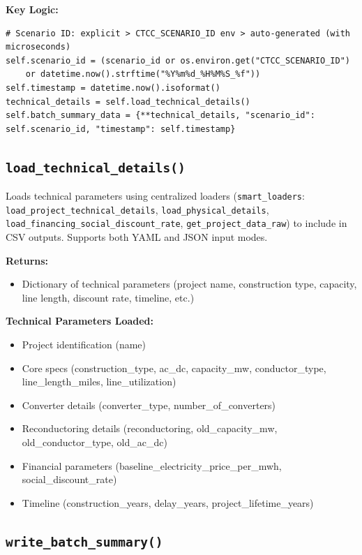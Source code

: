 \documentclass[ctcc_full_documentation.tex]{subfiles}
\begin{document}
\textbf{Key Logic:}
\begin{lstlisting}
# Scenario ID: explicit > CTCC_SCENARIO_ID env > auto-generated (with microseconds)
self.scenario_id = (scenario_id or os.environ.get("CTCC_SCENARIO_ID")
    or datetime.now().strftime("%Y%m%d_%H%M%S_%f"))
self.timestamp = datetime.now().isoformat()
technical_details = self.load_technical_details()
self.batch_summary_data = {**technical_details, "scenario_id": self.scenario_id, "timestamp": self.timestamp}
\end{lstlisting}

\subsection{\texttt{load\_technical\_details()}}

Loads technical parameters using centralized loaders (\texttt{smart\_loaders}: \texttt{load\_project\_technical\_details}, \texttt{load\_physical\_details}, \texttt{load\_financing\_social\_discount\_rate}, \texttt{get\_project\_data\_raw}) to include in CSV outputs. Supports both YAML and JSON input modes.

\textbf{Returns:}
\begin{itemize}
    \item Dictionary of technical parameters (project name, construction type, capacity, line length, discount rate, timeline, etc.)
\end{itemize}

\textbf{Technical Parameters Loaded:}
\begin{itemize}
    \item Project identification (name)
    \item Core specs (construction\_type, ac\_dc, capacity\_mw, conductor\_type, line\_length\_miles, line\_utilization)
    \item Converter details (converter\_type, number\_of\_converters)
    \item Reconductoring details (reconductoring, old\_capacity\_mw, old\_conductor\_type, old\_ac\_dc)
    \item Financial parameters (baseline\_electricity\_price\_per\_mwh, social\_discount\_rate)
    \item Timeline (construction\_years, delay\_years, project\_lifetime\_years)
\end{itemize}

\subsection{\texttt{write\_batch\_summary()}}
\end{document}
